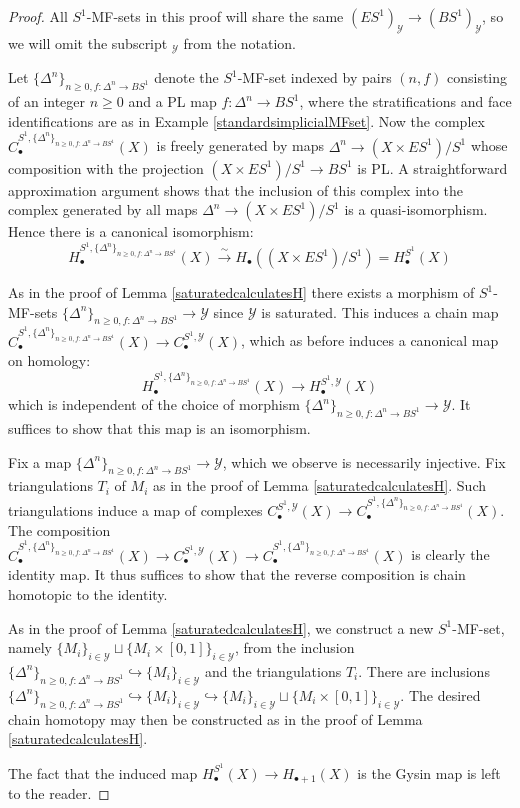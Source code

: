 \documentclass[12pt]{article}
\theoremstyle{definition}
\theoremstyle{remark}
\numberwithin{equation}{subsection}
\newcommand{\Y}{\mathcal Y}
\begin{document}
\begin{proof}
All $S^1$-MF-sets in this proof will share the same $(ES^1)_\Y\to(BS^1)_\Y$, so we will omit the subscript $_\Y$ from the notation.

Let $\{\Delta^n\}_{n\geq 0,f:\Delta^n\to BS^1}$ denote the $S^1$-MF-set indexed by pairs $(n,f)$ consisting of an integer $n\geq 0$ and a PL map $f:\Delta^n\to BS^1$, where the stratifications and face identifications are as in Example \ref{standardsimplicialMFset}.  Now the complex $C^{S^1,\{\Delta^n\}_{n\geq 0,f:\Delta^n\to BS^1}}_\bullet(X)$ is freely generated by maps $\Delta^n\to(X\times ES^1)/S^1$ whose composition with the projection $(X\times ES^1)/S^1\to BS^1$ is PL.  A straightforward approximation argument shows that the inclusion of this complex into the complex generated by all maps $\Delta^n\to(X\times ES^1)/S^1$ is a quasi-isomorphism.  Hence there is a canonical isomorphism:
\begin{equation}
H^{S^1,\{\Delta^n\}_{n\geq 0,f:\Delta^n\to BS^1}}_\bullet(X)\xrightarrow\sim H_\bullet((X\times ES^1)/S^1)=H_\bullet^{S^1}(X)
\end{equation}

As in the proof of Lemma \ref{saturatedcalculatesH} there exists a morphism of $S^1$-MF-sets $\{\Delta^n\}_{n\geq 0,f:\Delta^n\to BS^1}\to\Y$ since $\Y$ is saturated.  This induces a chain map $C^{S^1,\{\Delta^n\}_{n\geq 0,f:\Delta^n\to BS^1}}_\bullet(X)\to C^{S^1,\Y}_\bullet(X)$, which as before induces a canonical map on homology:
\begin{equation}
H^{S^1,\{\Delta^n\}_{n\geq 0,f:\Delta^n\to BS^1}}_\bullet(X)\to H^{S^1,\Y}_\bullet(X)
\end{equation}
which is independent of the choice of morphism $\{\Delta^n\}_{n\geq 0,f:\Delta^n\to BS^1}\to\Y$.  It suffices to show that this map is an isomorphism.

Fix a map $\{\Delta^n\}_{n\geq 0,f:\Delta^n\to BS^1}\to\Y$, which we observe is necessarily injective.  Fix triangulations $T_i$ of $M_i$ as in the proof of Lemma \ref{saturatedcalculatesH}.  Such triangulations induce a map of complexes $C^{S^1,\Y}_\bullet(X)\to C^{S^1,\{\Delta^n\}_{n\geq 0,f:\Delta^n\to BS^1}}_\bullet(X)$.  The composition $C^{S^1,\{\Delta^n\}_{n\geq 0,f:\Delta^n\to BS^1}}_\bullet(X)\to C^{S^1,\Y}_\bullet(X)\to C^{S^1,\{\Delta^n\}_{n\geq 0,f:\Delta^n\to BS^1}}_\bullet(X)$ is clearly the identity map.  It thus suffices to show that the reverse composition is chain homotopic to the identity.

As in the proof of Lemma \ref{saturatedcalculatesH}, we construct a new $S^1$-MF-set, namely $\{M_i\}_{i\in\Y}\sqcup\{M_i\times[0,1]\}_{i\in\Y}$, from the inclusion $\{\Delta^n\}_{n\geq 0,f:\Delta^n\to BS^1}\hookrightarrow\{M_i\}_{i\in\Y}$ and the triangulations $T_i$.  There are inclusions $\{\Delta^n\}_{n\geq 0,f:\Delta^n\to BS^1}\hookrightarrow\{M_i\}_{i\in\Y}\hookrightarrow\{M_i\}_{i\in\Y}\sqcup\{M_i\times[0,1]\}_{i\in\Y}$.  The desired chain homotopy may then be constructed as in the proof of Lemma \ref{saturatedcalculatesH}.

The fact that the induced map $H^{S^1}_\bullet(X)\to H_{\bullet+1}(X)$ is the Gysin map is left to the reader.
\end{proof}
\end{document}
